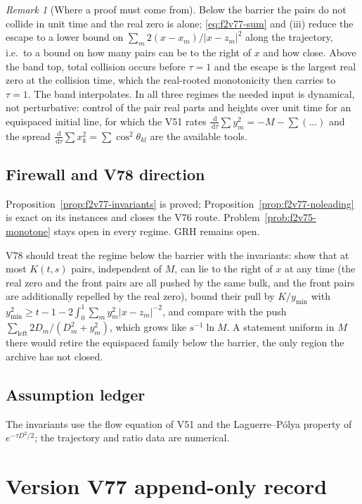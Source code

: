 \documentclass[11pt]{article}
\theoremstyle{definition}
\theoremstyle{remark}
\newtheorem{remark}[theorem]{Remark}
\newcommand{\dd}{\,\mathrm d}
\begin{document}
\begin{remark}[Where a proof must come from]
\label{rem:f2v77-where}
Below the barrier the pairs do not collide in unit time and the real
zero is alone; \eqref{eq:f2v77-sum} and (iii) reduce the escape to a
lower bound on \(\sum_m2(x-x_m)/|x-z_m|^2\) along the trajectory, i.e.\
to a bound on how many pairs can be to the right of \(x\) and how close.
Above the band top, total collision occurs before \(\tau=1\) and the
escape is the largest real zero at the collision time, which the
real-rooted monotonicity then carries to \(\tau=1\).  The band
interpolates.  In all three regimes the needed input is dynamical, not
perturbative: control of the pair real parts and heights over unit time
for an equispaced initial line, for which the V51 rates
\(\frac{\dd}{\dd\tau}\sum y_m^2=-M-\sum(\ldots)\) and the spread
\(\frac{\dd}{\dd\tau}\sum x_k^2=\sum\cos^2\theta_{kl}\) are the
available tools.
\end{remark}

\subsection*{Firewall and V78 direction}
\label{fire:f2v77}
Proposition~\ref{prop:f2v77-invariants} is proved;
Proposition~\ref{prop:f2v77-noleading} is exact on its instances and
closes the V76 route.  Problem~\ref{prob:f2v75-monotone} stays open in
every regime.  GRH remains open.

V78 should treat the regime below the barrier with the invariants: show
that at most \(K(t,s)\) pairs, independent of \(M\), can lie to the right
of \(x\) at any time (the real zero and the front pairs are all pushed
by the same bulk, and the front pairs are additionally repelled by the
real zero), bound their pull by \(K/y_{\min}\) with
\(y_{\min}^2\ge t-1-2\int_0^1\sum_m y_m^2|x-z_m|^{-2}\), and compare with
the push \(\sum_{\text{left}}2D_m/(D_m^2+y_m^2)\), which grows like
\(s^{-1}\ln M\).  A statement uniform in \(M\) there would retire the
equispaced family below the barrier, the only region the archive has not
closed.

\subsection*{Assumption ledger}
\label{ass:f2v77}
The invariants use the flow equation of V51 and the Laguerre--Pólya
property of \(e^{-\tau D^2/2}\); the trajectory and ratio data are
numerical.
\endgroup

\section*{Version V77 append-only record}
\end{document}
